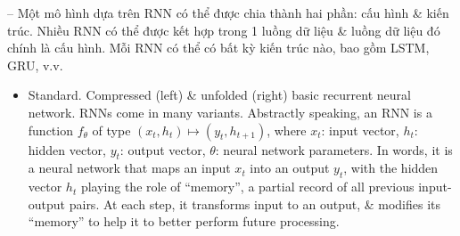 \documentclass{article}
\begin{document}
-- Một mô hình dựa trên RNN có thể được chia thành hai phần: cấu hình \& kiến trúc. Nhiều RNN có thể được kết hợp trong 1 luồng dữ liệu \& luồng dữ liệu đó chính là cấu hình. Mỗi RNN có thể có bất kỳ kiến trúc nào, bao gồm LSTM, GRU, v.v.
\begin{itemize}
	\item {\sf Standard.} {\sf Compressed (left) \& unfolded (right) basic recurrent neural network.} RNNs come in many variants. Abstractly speaking, an RNN is a function $f_\theta$ of type $(x_t,h_t)\mapsto(y_t,h_{t+1})$, where $x_t$: input vector, $h_t$: hidden vector, $y_t$: output vector, $\theta$: neural network parameters. In words, it is a neural network that maps an input $x_t$ into an output $y_t$, with the hidden vector $h_t$ playing the role of ``memory'', a partial record of all previous input-output pairs. At each step, it transforms input to an output, \& modifies its ``memory'' to help it to better perform future processing.
	

\end{itemize}
\end{document}
